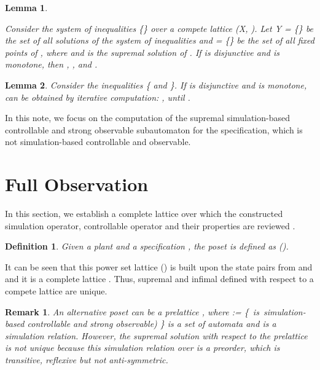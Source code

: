 \documentclass[12pt,draftcls,onecolumn]{IEEEtran}
\newtheorem{Lemma}{Lemma}
\newtheorem{Remark}{Remark}
\newtheorem{Definition}{Definition}
\begin{document}
\begin{Lemma}\label{l1}

Consider the system of inequalities \{\} over a compete lattice (X, ). Let Y
= \{\} be
the set of all solutions of the system of inequalities and 
= \{\} be the set of all fixed points
of , where  and  is the
supremal solution of . If  is
disjunctive and  is monotone, then , , and .
\end{Lemma}





\begin{Lemma}\label{l2}
Consider the inequalities \{
and \}. If  is disjunctive and  is monotone,
 can be obtained by iterative computation: ,
 until .



\end{Lemma}


In this note, we focus on the computation of the supremal
simulation-based controllable and strong observable subautomaton
for the specification, which is not simulation-based controllable
and observable.


\section{Full Observation}
In this section, we establish a complete lattice over which the
constructed simulation operator, controllable operator and their
properties are reviewed \cite{sun}.



\begin{Definition} Given a plant  and
a specification , the poset is
defined as ().
\end{Definition}

It can be seen that this power set lattice () is built upon the state pairs from  and  and it
is a complete lattice \cite{kb}. Thus, supremal and infimal
defined with respect to a compete lattice are unique.

\begin{Remark}
An alternative poset can be a prelattice ,
where := \{~is~simulation-based controllable and strong observable) \} is
a set of automata and  is a simulation relation. However,
the supremal solution with respect to the prelattice
 is not unique because this simulation
relation over  is a preorder, which is transitive,
reflexive but not anti-symmetric.






\end{Remark}
\end{document}
